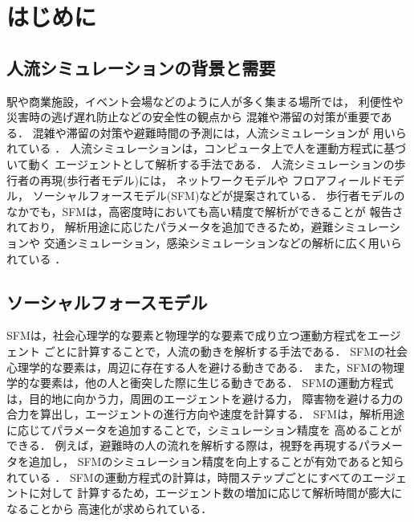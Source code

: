 \newcommand{\tensaku}[1]{#1}

\chapter{はじめに}
\label{sec:intro}
\tensaku{\section{人流シミュレーションの背景と需要}}
駅や商業施設，イベント会場などのように人が多く集まる場所では，
利便性や災害時の逃げ遅れ防止などの安全性の観点から
混雑や滞留の対策が重要である\cite{taisaku1}\cite{taisaku2}．
混雑や滞留の対策や避難時間の予測には，人流シミュレーションが
用いられている
\cite{sim_jirei1}\cite{sim_jirei2}\cite{sim_jirei3}\cite{sim_jirei8}\cite{sim_jirei7}．
人流シミュレーションは，コンピュータ上で人を運動方程式に基づいて動く
エージェントとして解析する手法である．
人流シミュレーションの歩行者の再現(歩行者モデル)には，
ネットワークモデルや
フロアフィールドモデル\cite{floa_field3}\cite{floa_field1}\cite{floa_field2}，
ソーシャルフォースモデル(SFM)\cite{helbing_sfm}などが提案されている．
歩行者モデルのなかでも，SFMは，高密度時においても高い精度で解析ができることが
報告されており\cite{???}，
解析用途に応じたパラメータを追加できるため，避難シミュレーションや
交通シミュレーション，感染シミュレーションなどの解析に広く用いられている
\cite{mas_pandemic}\cite{sfm_hinan1}\cite{sfm_hinan2}\cite{sfm_hinan3}
\cite{intro_gunshu}
．

\tensaku{\section{ソーシャルフォースモデル}}
SFMは，社会心理学的な要素と物理学的な要素で成り立つ運動方程式をエージェント
ごとに計算することで，人流の動きを解析する手法である．
SFMの社会心理学的な要素は，周辺に存在する人を避ける動きである．
また，SFMの物理学的な要素は，他の人と衝突した際に生じる動きである．
SFMの運動方程式は，目的地に向かう力，周囲のエージェントを避ける力，
障害物を避ける力の合力を算出し，エージェントの進行方向や速度を計算する．
SFMは，解析用途に応じてパラメータを追加することで，シミュレーション精度を
高めることができる．
例えば，避難時の人の流れを解析する際は，視野を再現するパラメータを追加し，
SFMのシミュレーション精度を向上することが有効であると知られている
\cite{siya_ex2}\cite{siya_ex3}\cite{siya_ex4}
\cite{siya_ex5}\cite{siya_ex6}\cite{siya_ex7}．
SFMの運動方程式の計算は，時間ステップごとにすべてのエージェントに対して
計算するため，エージェント数の増加に応じて解析時間が膨大になることから
高速化が求められている．


